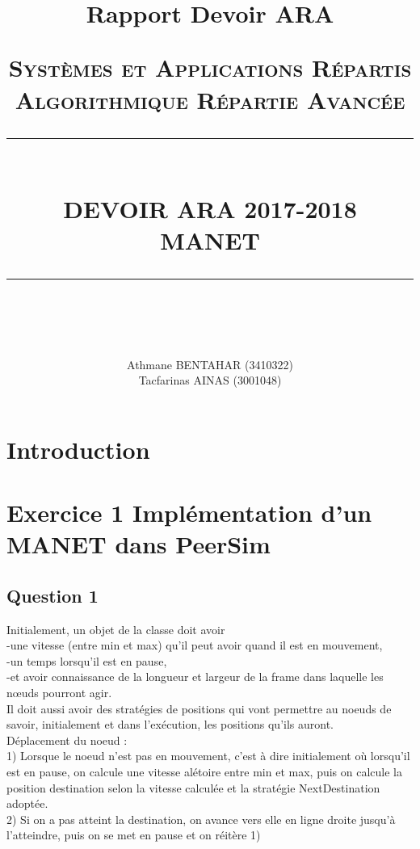 \documentclass[10pt]{report}
\title{Rapport Devoir ARA}															%
\newcommand{\HRule}[1]{\rule{\linewidth}{#1}}										%
\begin{document}
\title{ \normalsize \textsc{\LARGE {Systèmes et Applications Répartis}\\\Large{Algorithmique Répartie Avancée}}
		\\ [2.0cm]
		\HRule{0.5pt} \\
		\LARGE \textbf{\uppercase{Devoir ARA 2017-2018\\MANET}}
		\HRule{2pt} \\ [0.5cm]
		\normalsize \vspace*{3\baselineskip}}

\author{
		Athmane BENTAHAR (3410322)\\Tacfarinas AINAS (3001048)}

\maketitle
\tableofcontents
\newpage
\sectionfont{\scshape}
\section{Introduction}
\section{Exercice 1  Implémentation d'un MANET dans PeerSim}
\subsection{Question 1}

Initialement, un objet de la classe doit avoir \\
-une vitesse (entre min et max) qu'il peut avoir quand il est en mouvement, \\
-un temps lorsqu'il est en pause, \\
-et avoir connaissance de la longueur et largeur de la frame dans laquelle les nœuds pourront agir. \\
Il doit aussi avoir des stratégies de positions qui vont permettre au noeuds de savoir, initialement et dans l'exécution, les positions qu'ils auront. \\
Déplacement du noeud : \\
1) Lorsque le noeud n'est pas en mouvement, c'est à dire initialement où lorsqu'il est en pause, on calcule une vitesse alétoire entre min et max, puis on calcule la position destination selon la vitesse calculée et la stratégie NextDestination adoptée. \\
2) Si on a pas atteint la destination, on avance vers elle en ligne droite jusqu'à l'atteindre, puis on se met en pause et on réitère 1) \\
\end{document}
